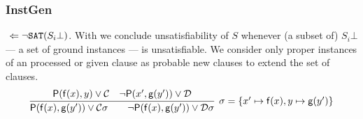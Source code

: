 \subsubsection{InstGen}

\jek{} \( \ \Leftarrow \lnot\texttt{SAT}(S_i\bot) \).
With \InstGen{} we conclude unsatisfiability of \( S \) whenever (a subset of) \( S_i\bot \) --- a set of ground instances --- is unsatisfiable.
We consider only proper instances of an processed or given clause
as probable new clauses to extend the set of clauses.
\begin{gather*}
	\infer[\sigma=\{ x'\mapsto\mf(x), y\mapsto\mg(y') \}]{
		\mP(\mf(x),\mg(y')) \lor\mcC\sigma
		\qquad
		\lnot\mP(\mf(x),\mg(y'))\lor\mcD\sigma
	}{
		\mP(\mf(x), y) \lor \mcC & \lnot\mP(x',\mg(y')) \lor \mcD
	}
\end{gather*}

